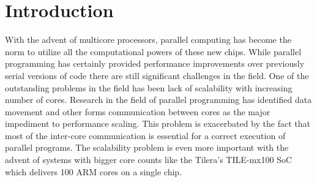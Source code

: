 \documentclass[12pt,conference]{IEEEtran}
\begin{document}




%
\IEEEpeerreviewmaketitle



\section{Introduction}


With the advent of multicore processors, parallel computing has become
the norm to utilize all the computational powers of these new chips. 
While parallel programming has certainly provided performance improvements
over previously serial versions of code there are still significant 
challenges in the field. One of the outstanding problems in the field
has been lack of scalability with increasing number of cores. Research
in the field of parallel programming has identified data movement and
other forms communication between cores as the major impediment to 
performance scaling. This problem is exacerbated by the fact that
most of the inter-core communication is essential for a correct execution
of parallel programs. The scalability problem is even more important with
the advent of systems with bigger core counts like the Tilera's TILE-mx100 SoC
which delivers 100 ARM cores on a single chip\cite{tile}.
\end{document}
